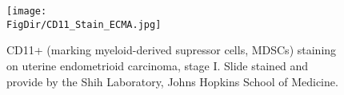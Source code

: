 \begin{figure}
  \centerline{\texttt{[image: \\FigDir/CD11\_Stain\_ECMA.jpg]}}
  \caption{CD11+ (marking myeloid-derived supressor cells, MDSCs) staining on uterine endometrioid carcinoma, stage I. Slide stained and provide by the Shih Laboratory, Johns Hopkins School of Medicine.}
\label{fig:CD11_Stain_ECMA}
\end{figure}
  